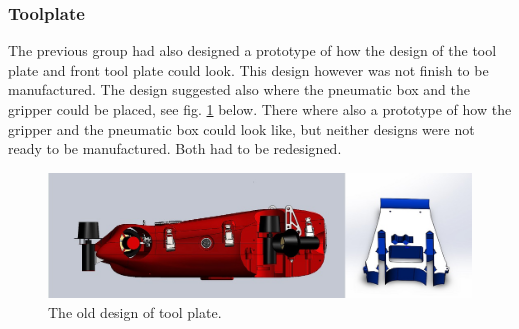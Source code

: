 \subsubsection{Toolplate}

The previous group had also designed a prototype of how the design of the tool plate and front tool plate could look. This design however was not finish to be manufactured. The design suggested also where the pneumatic box and the gripper could be placed, see fig. \ref{Toolplate} below. There where also a prototype of how the gripper and the pneumatic box could look like, but neither designs were not ready to be manufactured. Both had to be redesigned.

	\begin{figure}[!ht]
	\begin{center}
		\includegraphics[width=150mm]{./images/mechanics/Naiadassembly.JPG}
		\caption{The old design of tool plate.}
		\label{Toolplate}
	\end{center}
	\end{figure}
	
	
 